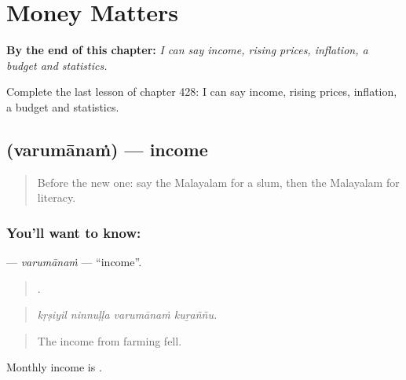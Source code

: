 
\chapter{Money Matters}
\label{ch:ml-money-matters}

\begin{chapteropening}
\textbf{By the end of this chapter:} \emph{I can say income, rising prices, inflation, a budget and statistics.}

Complete the last lesson of chapter 428: I can say income, rising prices, inflation, a budget and statistics.
\end{chapteropening}

\section[\texorpdfstring{\ml{വരുമാനം} (varumānaṁ)}{വരുമാനം (varumānaṁ)}]{ (varumānaṁ) — income}

\label{lesson:ML-C428-varumanam}



\begin{quote}
Before the new one: say the Malayalam for a slum, then the Malayalam for literacy.
\end{quote}

\subsection*{You'll want to know: }
\textbf{} — \emph{varumānaṁ} — \textquotedblleft{}income\textquotedblright{}.

\begin{quote}
   .
\end{quote}

\begin{quote}
\emph{kṛṣiyil ninnuḷḷa varumānaṁ kuṟaññu.}
\end{quote}

\begin{quote}
The income from farming fell.
\end{quote}

Monthly income is .

